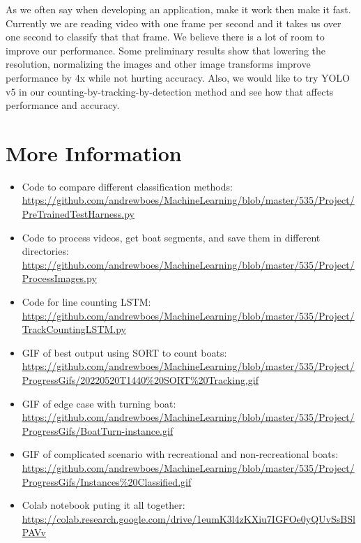 \documentclass[10pt,twocolumn,letterpaper]{article}
\begin{document}
As we often say when developing an application, make it work then make it fast. Currently we are reading video with one frame per second and it takes us over one second to classify that that frame. We believe there is a lot of room to improve our performance. Some preliminary results show that lowering the resolution, normalizing the images and other image transforms improve performance by 4x while not hurting accuracy. Also, we would like to try YOLO v5 in our counting-by-tracking-by-detection method and see how that affects performance and accuracy.

\section{More Information}

\begin{itemize}
    \renewcommand\labelitemi{--}
    \item Code to compare different classification methods: \url{https://github.com/andrewboes/MachineLearning/blob/master/535/Project/PreTrainedTestHarness.py}
    \item Code to process videos, get boat segments, and save them in different directories: \url{https://github.com/andrewboes/MachineLearning/blob/master/535/Project/ProcessImages.py}
    \item Code for line counting LSTM: \url{https://github.com/andrewboes/MachineLearning/blob/master/535/Project/TrackCountingLSTM.py} 
    \item GIF of best output using SORT to count boats: \url{https://github.com/andrewboes/MachineLearning/blob/master/535/Project/ProgressGifs/20220520T1440\%20SORT\%20Tracking.gif}
    \item GIF of edge case with turning boat: \url{https://github.com/andrewboes/MachineLearning/blob/master/535/Project/ProgressGifs/BoatTurn-instance.gif}
    \item GIF of complicated scenario with recreational and non-recreational boats: \url{https://github.com/andrewboes/MachineLearning/blob/master/535/Project/ProgressGifs/Instances\%20Classified.gif}
    \item Colab notebook puting it all together: \url{https://colab.research.google.com/drive/1eumK3l4zKXiu7IGFOe0yQUvSsBSlPAVv}
\end{itemize}
\end{document}
